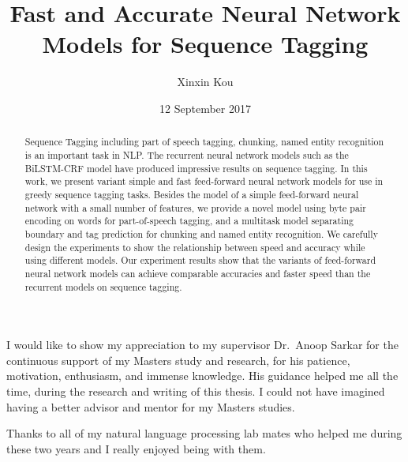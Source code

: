 \documentclass{sfuthesis}
\title{Fast and Accurate Neural Network Models for Sequence Tagging}
\author{Xinxin Kou}
\date{12 September 2017}
\begin{document}
\frontmatter
\maketitle{}
\makecommittee{}

\begin{abstract}
Sequence Tagging including part of speech tagging, chunking, named entity recognition is an important task in NLP. The recurrent neural network models such as the BiLSTM-CRF model have produced impressive results on sequence tagging. In this work, we present variant simple and fast feed-forward neural network models for use in greedy sequence tagging tasks. Besides the model of a simple feed-forward neural network with a small number of features, we provide a novel model using byte pair encoding on words for part-of-speech tagging, and a multitask model separating boundary and tag prediction for chunking and named entity recognition. We carefully design the experiments to show the relationship between speed and accuracy while using different models. Our experiment results show that the variants of feed-forward neural network models can achieve comparable accuracies and faster speed than the recurrent models on sequence tagging.
\end{abstract}


\begin{acknowledgements} %

I would like to show my appreciation to my supervisor Dr.\ Anoop Sarkar for the continuous support of my Masters study and research, for his patience, motivation, enthusiasm, and immense knowledge. His guidance helped me all the time, during the research and writing of this thesis. I could not have imagined having a better advisor and mentor for my Masters studies.

Thanks to all of my natural language processing lab mates who helped me during these two years and I really enjoyed being with them. 


\end{acknowledgements}

\tableofcontents\clearpage
{}\listoftables\clearpage
{}\listoffigures





%
%
\end{document}
